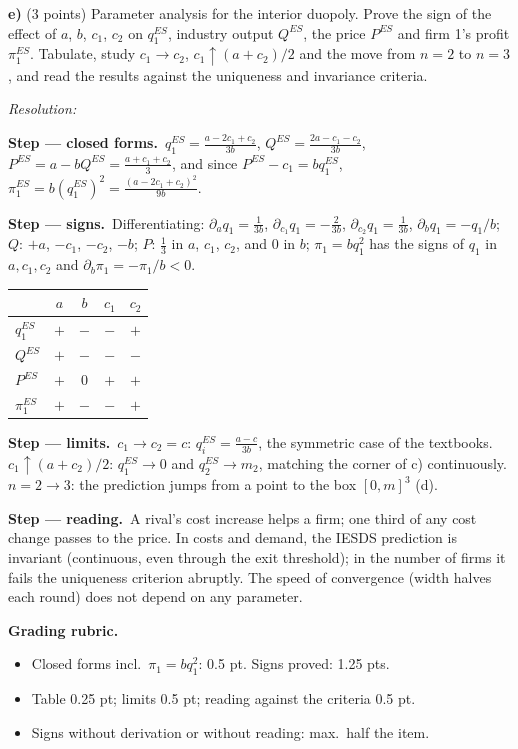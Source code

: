 \documentclass[11pt,a4paper]{article}
\newif\ifsolucoes
\newcommand{\espacoresol}{5cm}   %
\newcommand{\resolespaco}{\ifsolucoes\else\par\textit{Resolution:}\vspace{\espacoresol}\par\fi}
\newcommand{\passo}[2]{\par\smallskip\noindent\textbf{Step --- #1.}~#2}
\newcommand{\rubrica}[1]{\par\smallskip\noindent\textbf{Grading rubric.}\begin{itemize}[leftmargin=1.4em,topsep=1pt]#1\end{itemize}}
\begin{document}
\textbf{e)} (3 points) Parameter analysis for the interior duopoly. Prove the sign of the effect of
$a$, $b$, $c_1$, $c_2$ on $q_1^{ES}$, industry output $Q^{ES}$, the price $P^{ES}$ and firm 1's
profit $\pi_1^{ES}$. Tabulate, study $c_1\to c_2$, $c_1\uparrow(a+c_2)/2$ and the move from $n=2$ to
$n=3$, and read the results against the uniqueness and invariance criteria.
\resolespaco
\begin{sol}
\passo{closed forms}{$q_1^{ES}=\tfrac{a-2c_1+c_2}{3b}$, $Q^{ES}=\tfrac{2a-c_1-c_2}{3b}$,
$P^{ES}=a-bQ^{ES}=\tfrac{a+c_1+c_2}3$, and since $P^{ES}-c_1=bq_1^{ES}$,
$\pi_1^{ES}=b(q_1^{ES})^2=\tfrac{(a-2c_1+c_2)^2}{9b}$.}
\passo{signs}{Differentiating: $\partial_aq_1=\tfrac1{3b}$, $\partial_{c_1}q_1=-\tfrac2{3b}$,
$\partial_{c_2}q_1=\tfrac1{3b}$, $\partial_bq_1=-q_1/b$; $Q$: $+a$, $-c_1$, $-c_2$, $-b$;
$P$: $\tfrac13$ in $a$, $c_1$, $c_2$, and $0$ in $b$; $\pi_1=b q_1^2$ has the signs of $q_1$ in
$a,c_1,c_2$ and $\partial_b\pi_1=-\pi_1/b<0$.}
\begin{center}
\begin{tabular}{lcccc}\toprule
 & $a$ & $b$ & $c_1$ & $c_2$\\\midrule
$q_1^{ES}$ & $+$ & $-$ & $-$ & $+$\\
$Q^{ES}$ & $+$ & $-$ & $-$ & $-$\\
$P^{ES}$ & $+$ & $0$ & $+$ & $+$\\
$\pi_1^{ES}$ & $+$ & $-$ & $-$ & $+$\\\bottomrule
\end{tabular}
\end{center}
\passo{limits}{$c_1\to c_2=c$: $q_i^{ES}=\tfrac{a-c}{3b}$, the symmetric case of the textbooks.
$c_1\uparrow(a+c_2)/2$: $q_1^{ES}\to0$ and $q_2^{ES}\to m_2$, matching the corner of c)
continuously. $n=2\to3$: the prediction jumps from a point to the box $[0,m]^3$ (d).}
\passo{reading}{A rival's cost increase helps a firm; one third of any cost change passes to the price.
In costs and demand, the IESDS prediction is invariant (continuous, even through the exit threshold);
in the number of firms it fails the uniqueness criterion abruptly. The speed of convergence (width
halves each round) does not depend on any parameter.}
\rubrica{
\item Closed forms incl.\ $\pi_1=bq_1^2$: 0.5 pt. Signs proved: 1.25 pts.
\item Table 0.25 pt; limits 0.5 pt; reading against the criteria 0.5 pt.
\item Signs without derivation or without reading: max.\ half the item.
}
\end{sol}
\end{document}

